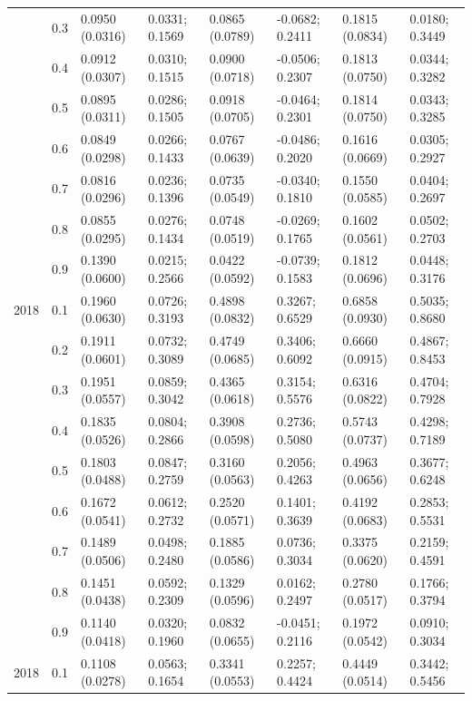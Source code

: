 \begin{table}
{\begin{tabular}[t]{llllllll}
 & 0.3 & 0.0950 (0.0316) & 0.0331; 0.1569 & 0.0865 (0.0789) & -0.0682; 0.2411 & 0.1815 (0.0834) & 0.0180; 0.3449\\
 & 0.4 & 0.0912 (0.0307) & 0.0310; 0.1515 & 0.0900 (0.0718) & -0.0506; 0.2307 & 0.1813 (0.0750) & 0.0344; 0.3282\\
 & 0.5 & 0.0895 (0.0311) & 0.0286; 0.1505 & 0.0918 (0.0705) & -0.0464; 0.2301 & 0.1814 (0.0750) & 0.0343; 0.3285\\
 & 0.6 & 0.0849 (0.0298) & 0.0266; 0.1433 & 0.0767 (0.0639) & -0.0486; 0.2020 & 0.1616 (0.0669) & 0.0305; 0.2927\\
 & 0.7 & 0.0816 (0.0296) & 0.0236; 0.1396 & 0.0735 (0.0549) & -0.0340; 0.1810 & 0.1550 (0.0585) & 0.0404; 0.2697\\
 & 0.8 & 0.0855 (0.0295) & 0.0276; 0.1434 & 0.0748 (0.0519) & -0.0269; 0.1765 & 0.1602 (0.0561) & 0.0502; 0.2703\\
 & 0.9 & 0.1390 (0.0600) & 0.0215; 0.2566 & 0.0422 (0.0592) & -0.0739; 0.1583 & 0.1812 (0.0696) & 0.0448; 0.3176\\
2018 & 0.1 & 0.1960 (0.0630) & 0.0726; 0.3193 & 0.4898 (0.0832) & 0.3267; 0.6529 & 0.6858 (0.0930) & 0.5035; 0.8680\\
 & 0.2 & 0.1911 (0.0601) & 0.0732; 0.3089 & 0.4749 (0.0685) & 0.3406; 0.6092 & 0.6660 (0.0915) & 0.4867; 0.8453\\
 & 0.3 & 0.1951 (0.0557) & 0.0859; 0.3042 & 0.4365 (0.0618) & 0.3154; 0.5576 & 0.6316 (0.0822) & 0.4704; 0.7928\\
 & 0.4 & 0.1835 (0.0526) & 0.0804; 0.2866 & 0.3908 (0.0598) & 0.2736; 0.5080 & 0.5743 (0.0737) & 0.4298; 0.7189\\
 & 0.5 & 0.1803 (0.0488) & 0.0847; 0.2759 & 0.3160 (0.0563) & 0.2056; 0.4263 & 0.4963 (0.0656) & 0.3677; 0.6248\\
 & 0.6 & 0.1672 (0.0541) & 0.0612; 0.2732 & 0.2520 (0.0571) & 0.1401; 0.3639 & 0.4192 (0.0683) & 0.2853; 0.5531\\
 & 0.7 & 0.1489 (0.0506) & 0.0498; 0.2480 & 0.1885 (0.0586) & 0.0736; 0.3034 & 0.3375 (0.0620) & 0.2159; 0.4591\\
 & 0.8 & 0.1451 (0.0438) & 0.0592; 0.2309 & 0.1329 (0.0596) & 0.0162; 0.2497 & 0.2780 (0.0517) & 0.1766; 0.3794\\
 & 0.9 & 0.1140 (0.0418) & 0.0320; 0.1960 & 0.0832 (0.0655) & -0.0451; 0.2116 & 0.1972 (0.0542) & 0.0910; 0.3034\\
2018 & 0.1 & 0.1108 (0.0278) & 0.0563; 0.1654 & 0.3341 (0.0553) & 0.2257; 0.4424 & 0.4449 (0.0514) & 0.3442; 0.5456\\

\end{tabular}}
\end{table}
